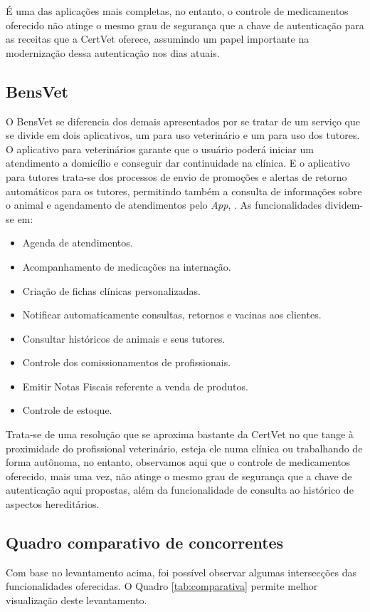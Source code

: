 \documentclass[
    12pt,               %
    openright,          %
    oneside,
    a4paper,            %
    BIBLATEX,           %
    TODO,               %
    english,            %
    brazil              %
    ]{ifsp-spo-inf-ctds}
\begin{document}
    É uma das aplicações mais completas, no entanto, o controle de medicamentos oferecido não atinge o mesmo grau de segurança que a chave de autenticação para as receitas que a CertVet oferece, assumindo um papel importante na modernização dessa autenticação nos dias atuais.

        \subsection{BensVet}
        O BensVet se diferencia dos demais apresentados por se tratar de um serviço que se divide em dois aplicativos, um para uso veterinário e um para uso dos tutores. O aplicativo para veterinários garante que o usuário poderá iniciar um atendimento a domicílio e conseguir  dar continuidade na clínica. E o aplicativo para tutores trata-se dos processos de envio  de promoções e alertas de retorno automáticos para os tutores, permitindo também a consulta de  informações sobre o animal e agendamento de atendimentos pelo \emph{App},  . As funcionalidades dividem-se em:

\begin{itemize}
    \item Agenda de atendimentos.
    \item Acompanhamento de medicações na internação.
    \item Criação de fichas clínicas personalizadas.
    \item Notificar automaticamente consultas, retornos e vacinas aos clientes.
    \item Consultar históricos de animais e seus tutores.
    \item Controle dos comissionamentos de profissionais.
    \item Emitir Notas Fiscais referente a venda de produtos.
    \item Controle de estoque.
\end{itemize}

    Trata-se de uma resolução que se aproxima bastante da CertVet no que tange à proximidade do profissional veterinário, esteja ele numa clínica ou trabalhando de forma autônoma, no entanto, observamos aqui que o controle de medicamentos oferecido, mais uma vez, não atinge o mesmo grau de segurança que a chave de autenticação aqui propostas, além da funcionalidade de consulta ao histórico de aspectos hereditários.

    \subsection{Quadro comparativo de concorrentes}
    Com base no levantamento acima, foi possível observar algumas intersecções das funcionalidades oferecidas. O Quadro \ref{tab:comparativa} permite melhor visualização deste levantamento.
\end{document}
